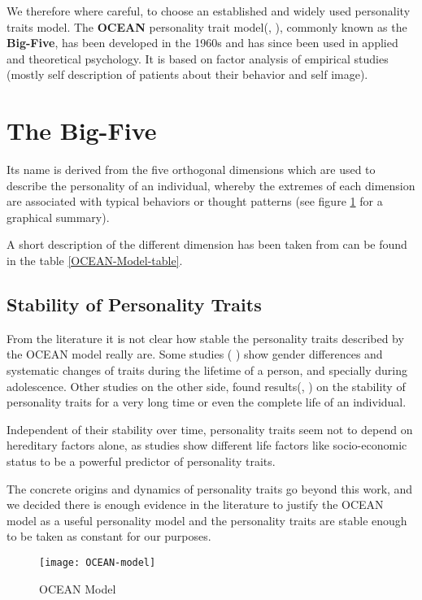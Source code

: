 We therefore where careful, to choose an established and widely used personality traits model.
The \textbf{OCEAN} personality trait model(\cite{Tupes1961}, \cite{John1999}), commonly known as the \textbf{Big-Five}, has been developed
in the 1960s and has since been used in applied and theoretical psychology.
It is based on factor analysis of empirical studies (mostly self description of patients about their
behavior and self image).

\section{The Big-Five}
Its name is derived from the five orthogonal dimensions which are used to describe
the personality of an individual, whereby the extremes of each dimension are associated
with typical behaviors or thought patterns (see figure \ref{OCEAN-Model} for a graphical
summary).

A short description of the different dimension has been taken from\cite{Ehrler1999}
can be found in the table \ref{OCEAN-Model-table}.

\subsection{Stability of Personality Traits}
From the literature it is not clear how stable the personality traits described
by the OCEAN model really are. Some studies (\cite{Srivastava2003} \cite{Soto2011}) 
show gender differences and systematic changes of traits during the lifetime of 
a person, and specially during adolescence. Other studies on the other side, found
results(\cite{Soldz1999}, \cite{Cobb-Clark2012}) on the stability of personality traits for a very long time or even the
complete life of an individual.

\bb

Independent of their stability over time, personality traits seem not to depend on
hereditary factors alone, as studies\cite{Deckers2015} show different life factors like socio-economic status
to be a powerful predictor of personality traits.

\bb

The concrete origins and dynamics of personality traits go beyond this work, and
we decided there is enough evidence in the literature to justify the OCEAN
model as a useful personality model and the personality traits are stable enough
to be taken as constant for our purposes.

\begin{figure}[h]
    \centering
    \texttt{[image: OCEAN-model]} 
    \caption{OCEAN Model}
    \label{OCEAN-Model}
\end{figure}

